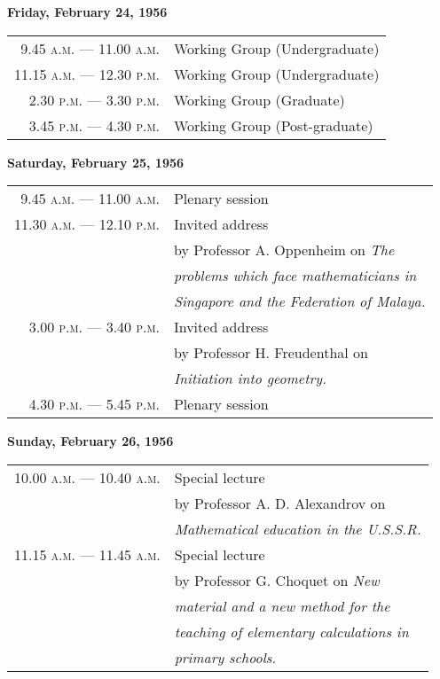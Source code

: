 \begin{center}
{\bf Friday, February 24, 1956}
\end{center}
\begin{longtable}[l]{r@{\;\;}l}
9.45 \textsc{a.m.} --- 11.00 \textsc{a.m.} & Working Group (Undergraduate)\\[5pt]
11.15 \textsc{a.m.} --- 12.30 \textsc{p.m.} & Working Group (Undergraduate)\\[5pt]
2.30 \textsc{p.m.} --- 3.30 \textsc{p.m.} & Working Group (Graduate)\\[5pt]
3.45 \textsc{p.m.} --- 4.30 \textsc{p.m.} & Working Group (Post-graduate)
\end{longtable}

\begin{center}
{\bf Saturday, February 25, 1956}
\end{center}
\begin{longtable}[l]{r@{\;\;}l}
9.45 \textsc{a.m.} --- 11.00 \textsc{a.m.} & Plenary session\\[6pt]
11.30 \textsc{a.m.} --- 12.10 \textsc{p.m.} & Invited address\\[3pt]
              & by Professor A. Oppenheim on {\em The}\\
              & {\em problems which face mathematicians in}\\
              & {\em Singapore and the Federation of Malaya.}\\[8pt]
3.00 \textsc{p.m.} --- 3.40 \textsc{p.m.} & Invited address\\[3pt]
              & by Professor H. Freudenthal on\\
              & {\em Initiation into geometry.}\\[6pt]
4.30 \textsc{p.m.} --- 5.45 \textsc{p.m.} & Plenary session
\end{longtable}

\begin{center}
{\bf Sunday, February 26, 1956}
\end{center}
\begin{longtable}[l]{r@{\;\;}l}
10.00 \textsc{a.m.} --- 10.40 \textsc{a.m.} & Special lecture\\
               & by Professor A. D. Alexandrov on\\
               & {\em Mathematical education in the U.S.S.R.}\\[6pt]
11.15 \textsc{a.m.} --- 11.45 \textsc{a.m.} & Special lecture\\
          & by Professor G. Choquet on {\em New}\\
          & {\em material and a new method for the}\\
          & {\em teaching of elementary calculations in}\\
          & {\em primary schools.}
\end{longtable}

